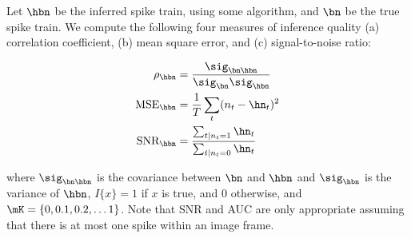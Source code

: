 Let $\hbn$ be the inferred spike train, using some algorithm, and $\bn$ be the true spike train.  We compute the following four measures of inference quality (a) correlation coefficient, (b) mean square error, and (c) signal-to-noise ratio: %

\begin{subequations} \label{eq:stats}
\begin{align}
	\rho_{\hbn} &= \frac{\sig_{\bn \hbn}}{\sig_{\bn}\sig_{\hbn}} \label{eq:R}\\
	\text{MSE}_{\hbn} &= \frac{1}{T} \sum_t (n_t - \hn_t)^2 \label{eq:MSE}\\
	\text{SNR}_{\hbn} &= \frac{\sum_{t | n_t=1} \hn_t}{\sum_{t | n_t=0} \hn_t} \label{eq:SNR} %
\end{align}
\end{subequations}

\noindent where $\sig_{\bn \hbn}$ is the covariance between $\bn$ and $\hbn$ and $\sig_{\hbn}$ is the variance of $\hbn$, $I\{x\}=1$ if $x$ is true, and $0$ otherwise, and $\mK=\{0,0.1,0.2,\ldots 1\}$.  Note that SNR and AUC are only appropriate assuming that there is at most one spike within an image frame. 